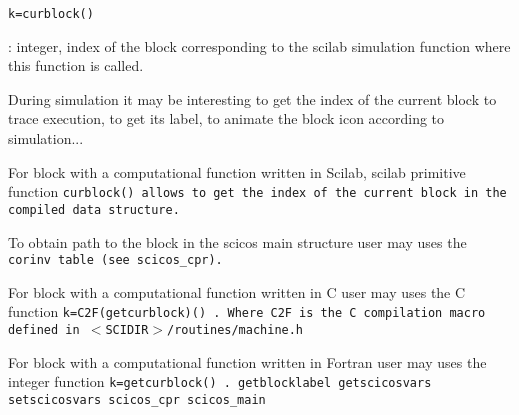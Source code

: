\label{curblock}

\begin{verbatim}
k=curblock()
\end{verbatim}
\begin{scitem}
\item[{\verb?k?}]
: integer, index of the block corresponding to the scilab simulation
function where this function is called.
\end{scitem}%
During simulation it may be interesting to get the index of the current
block to trace execution, to get its label, to animate the block icon
according to simulation...
\par\noindent
For block with a computational function written in Scilab, scilab
primitive function %
\tt curblock() %
\rm  allows to get the index of the
current block in the compiled data structure.
\par\noindent
To obtain path to the block in the scicos main structure user may uses
the %
\tt corinv %
\rm table (see scicos\_cpr).
\par\noindent
For block with a computational function written in C user may uses the
C function  %
\tt k=C2F(getcurblock)()%
\rm . Where %
\tt C2F %
\rm is the C
compilation macro defined in %
\tt $<$SCIDIR$>$/routines/machine.h %
\rm \par\noindent
For block with a computational function written in Fortran user may uses the
integer  function  %
\tt k=getcurblock()%
\rm .
{\verb?getblocklabel getscicosvars setscicosvars scicos_cpr scicos_main?} \pageref{getblocklabelgetscicosvarssetscicosvarsscicoscprscicosmain}





%
%


\label{getblocklabel}

